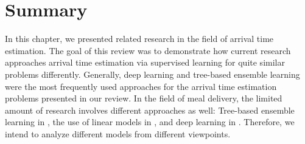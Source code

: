 \section{Summary}

In this chapter, we presented related research in the field of arrival time estimation. The goal of this review was to demonstrate how current research approaches arrival time estimation via supervised learning for quite similar problems differently. Generally, deep learning and tree-based ensemble learning were the most frequently used approaches for the arrival time estimation problems presented in our review. In the field of meal delivery, the limited amount of research involves different approaches as well: Tree-based ensemble learning in \cite{Hildebrandt2020_EAT}, the use of linear models in \cite{Liu2018_LM_PLM}, and deep learning in \cite{Zhu2020_OFCTE_DL}. Therefore, we intend to analyze different models from different viewpoints. 